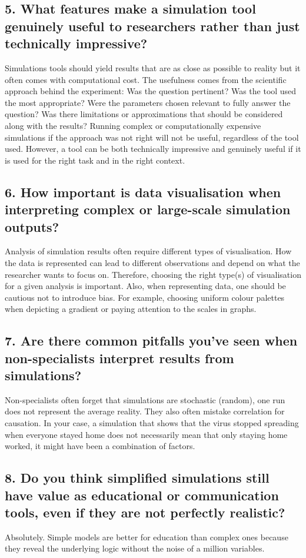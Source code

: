 \subsection*{5. What features make a simulation tool genuinely useful to researchers rather than just technically impressive?}
Simulations tools should yield results that are as close as possible to reality but it often comes with computational cost. The usefulness comes from the scientific approach behind the experiment: Was the question pertinent? Was the tool used the most appropriate? Were the parameters chosen relevant to fully answer the question? Was there limitations or approximations that should be considered along with the results? Running complex or computationally expensive simulations if the approach was not right will not be useful, regardless of the tool used. However, a tool can be both technically impressive and genuinely useful if it is used for the right task and in the right context.

\subsection*{6. How important is data visualisation when interpreting complex or large-scale simulation outputs?}
Analysis of simulation results often require different types of visualisation. How the data is represented can lead to different observations and depend on what the researcher wants to focus on. Therefore, choosing the right type(s) of visualisation for a given analysis is important. Also, when representing data, one should be cautious not to introduce bias. For example, choosing uniform colour palettes when depicting a gradient or paying attention to the scales in graphs.

\subsection*{7. Are there common pitfalls you’ve seen when non-specialists interpret results from simulations?}
Non-specialists often forget that simulations are stochastic (random), one run does not represent the average reality. They also often mistake correlation for causation. In your case, a simulation that shows that the virus stopped spreading when everyone stayed home does not necessarily mean that only staying home worked, it might have been a combination of factors.

\subsection*{8. Do you think simplified simulations still have value as educational or communication tools, even if they are not perfectly realistic?}
Absolutely. Simple models are better for education than complex ones because they reveal the underlying logic without the noise of a million variables.

